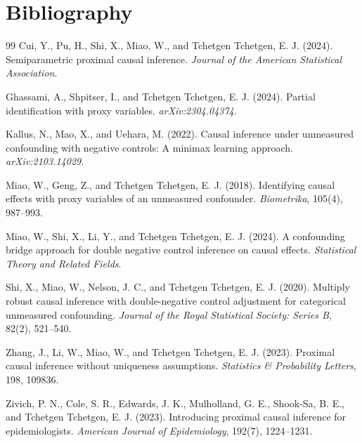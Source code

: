 \documentclass[11pt]{article}
\theoremstyle{definition}
\theoremstyle{plain}
\theoremstyle{remark}
\begin{document}
\section*{Bibliography}
\begin{thebibliography}{99}
Cui, Y., Pu, H., Shi, X., Miao, W., and Tchetgen Tchetgen, E. J. (2024).
Semiparametric proximal causal inference.
\emph{Journal of the American Statistical Association}.

Ghassami, A., Shpitser, I., and Tchetgen Tchetgen, E. J. (2024).
Partial identification with proxy variables.
\emph{arXiv:2304.04374}.

Kallus, N., Mao, X., and Uehara, M. (2022).
Causal inference under unmeasured confounding with negative controls: A minimax learning approach.
\emph{arXiv:2103.14029}.

Miao, W., Geng, Z., and Tchetgen Tchetgen, E. J. (2018).
Identifying causal effects with proxy variables of an unmeasured confounder.
\emph{Biometrika}, 105(4), 987--993.

Miao, W., Shi, X., Li, Y., and Tchetgen Tchetgen, E. J. (2024).
A confounding bridge approach for double negative control inference on causal effects.
\emph{Statistical Theory and Related Fields}.

Shi, X., Miao, W., Nelson, J. C., and Tchetgen Tchetgen, E. J. (2020).
Multiply robust causal inference with double-negative control adjustment for categorical unmeasured confounding.
\emph{Journal of the Royal Statistical Society: Series B}, 82(2), 521--540.

Zhang, J., Li, W., Miao, W., and Tchetgen Tchetgen, E. J. (2023).
Proximal causal inference without uniqueness assumptions.
\emph{Statistics \& Probability Letters}, 198, 109836.

Zivich, P. N., Cole, S. R., Edwards, J. K., Mulholland, G. E., Shook-Sa, B. E., and Tchetgen Tchetgen, E. J. (2023).
Introducing proximal causal inference for epidemiologists.
\emph{American Journal of Epidemiology}, 192(7), 1224--1231.
\end{thebibliography}
\end{document}
